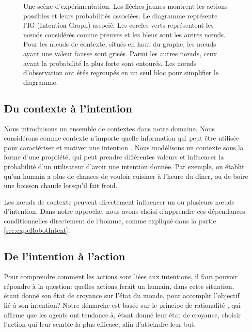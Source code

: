 \documentclass[a4paper,11pt,twoside]{StyleThese}
\begin{document}
\begin{figure}[h!]
	\caption{Une scène d'expérimentation. Les flèches jaunes montrent les actions possibles et leurs probabilités associées. Le diagramme représente l'IG (Intention Graph) associé. Les cercles verts représentent les nœuds considérés comme preuves et les bleus sont les autres nœuds. Pour les nœuds de contexte, situés en haut du graphe, les nœuds ayant une valeur fausse sont grisés. Parmi les autres nœuds, ceux ayant la probabilité la plus forte sont entourés. Les nœuds d'observation ont étés regroupés en un seul bloc pour simplifier le diagramme.}
	\label{fig:intention_graph}
   	\vspace{-20pt}
\end{figure}

\subsection{Du contexte à l'intention}
Nous introduisons un ensemble de contextes dans notre domaine. Nous considérons comme contexte n'importe quelle information qui peut être utilisée pour caractériser et motiver une intention \cite{abowd1999towards}. Nous modélisons un contexte sous la forme d'une propriété, qui peut prendre différentes valeurs et influencer la probabilité d'un utilisateur d'avoir une intention donnée. Par exemple, on établit qu'un humain a plus de chances de vouloir cuisiner à l'heure du dîner, ou de boire une boisson chaude lorsqu'il fait froid.

Les nœuds de contexte peuvent directement influencer un ou plusieurs nœuds d'intention. Dans notre approche, nous avons choisi d'apprendre ces dépendances conditionnelles directement de l'homme, comme expliqué dans la partie \ref{sec:expeRobotIntent}.

\subsection{De l'intention à l'action}
\label{action_evaluation}
Pour comprendre comment les actions sont liées aux intentions, il faut pouvoir répondre à la question: quelles actions ferait un humain, dans cette situation, étant donné son état de croyance sur l'état du monde, pour accomplir l'objectif lié à son intention? 
Notre démarche est basée sur le principe de rationalité \cite{Dennet1989}, qui affirme que les agents ont tendance à, étant donné leur état de croyance, choisir l'action qui leur semble la plus efficace, afin d'atteindre leur but.
\end{document}
